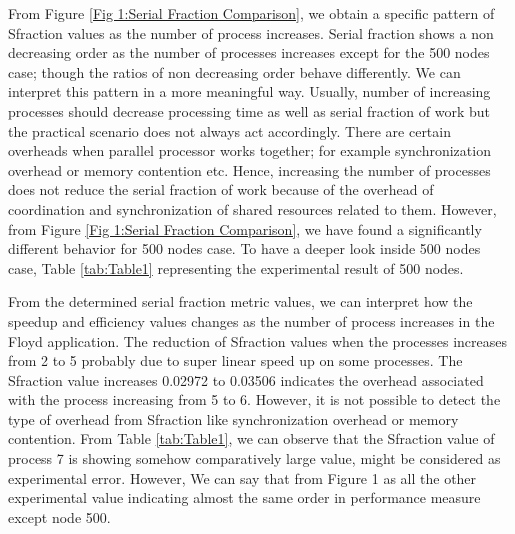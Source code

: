 From Figure \ref{Fig 1:Serial Fraction Comparison}, we obtain a specific pattern of Sfraction values
as the number of process increases. Serial fraction shows a non decreasing order as the number of processes increases except for the 500 nodes case; though the ratios of non decreasing order behave differently. We can interpret this pattern in a more meaningful way. Usually, number of increasing processes should decrease processing time as well as serial fraction of work but the practical scenario does not always act accordingly. There are certain overheads when parallel processor works together; for example synchronization overhead or memory
contention etc. Hence, increasing the number of processes does not
reduce the serial fraction of work because of the overhead of coordination and synchronization of shared resources related to them. However, from Figure \ref{Fig 1:Serial Fraction Comparison}, we have found a significantly
different behavior for 500 nodes case. To have a deeper look inside 500 nodes case, Table \ref{tab:Table1} representing the experimental result of 500 nodes.

From the determined serial fraction metric values, we can interpret how the speedup and efficiency values changes as the number of process increases in the Floyd application. The reduction of Sfraction values when the processes increases from 2 to 5 probably due to super linear speed up on some processes. The Sfraction value increases  0.02972 to 0.03506 indicates the overhead associated with the process increasing from 5 to 6. However, it is not possible to detect the type of overhead from Sfraction like synchronization overhead or memory contention. From Table \ref{tab:Table1}, we can observe that the Sfraction value of process 7 is showing somehow comparatively large value, might be considered as experimental error. However, We can say that from Figure 1 as all the other experimental value indicating almost the same order in performance measure except node 500.

